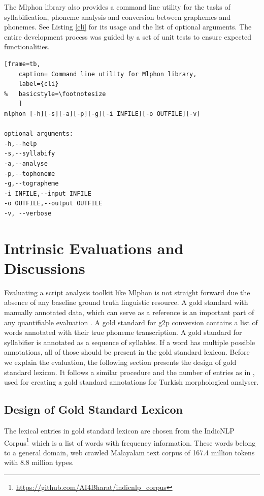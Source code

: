 \documentclass{ieeeaccess}
\begin{document}
The Mlphon library also provides a command line utility for the tasks of syllabification, phoneme analysis and conversion between graphemes and phonemes.
See Listing \ref{cli} for its usage and the list of optional arguments.
The entire development process was guided by a set of unit tests to ensure expected functionalities.

\begin{lstlisting}[frame=tb,
	caption= Command line utility for Mlphon library,
	label={cli}
%	basicstyle=\footnotesize
	]
mlphon [-h][-s][-a][-p][-g][-i INFILE][-o OUTFILE][-v]

optional arguments:
-h,--help 
-s,--syllabify
-a,--analyse
-p,--tophoneme
-g,--tographeme
-i INFILE,--input INFILE	
-o OUTFILE,--output OUTFILE	
-v, --verbose
\end{lstlisting}

\section{Intrinsic Evaluations and Discussions}
\label{goldlexicon}

Evaluating a script analysis toolkit like Mlphon is not straight forward due the absence of any baseline ground truth linguistic resource. A gold standard with manually annotated data, which can serve as a reference is an important part of any quantifiable evaluation \cite{kayabacs2019trmor}. A gold standard for g2p conversion contains a list of words annotated with their true phoneme transcription. A gold standard for syllabifier is annotated as a sequence of syllables. If a word has multiple possible annotations, all of those should be present in the gold standard lexicon. Before we explain the evaluation, the following section presents the design of gold standard lexicon. It follows a similar procedure and the number of entries as in \cite{kayabacs2019trmor}, used for creating a gold standard annotations for Turkish morphological analyser.

\subsection{Design of Gold Standard Lexicon}

The lexical entries in gold standard lexicon are chosen from the IndicNLP Corpus\footnote{\url{https://github.com/AI4Bharat/indicnlp_corpus}} \cite{kunchukuttan2020ai4bharat} which is a list of words with frequency information. These words belong to a general domain, web crawled Malayalam text corpus of 167.4 million tokens with 8.8 million types. 
\end{document}
